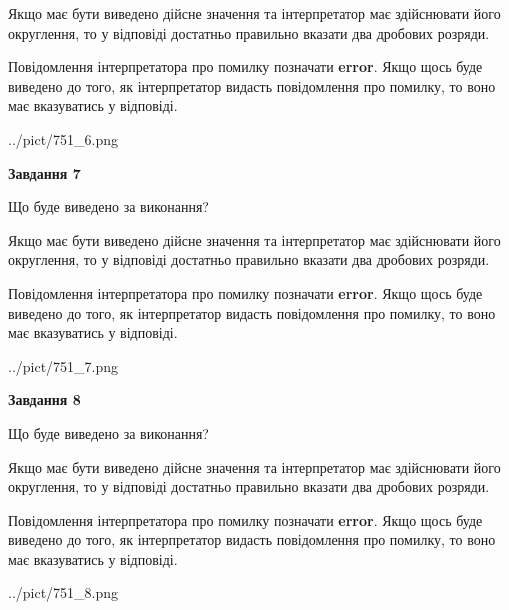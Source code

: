 \documentclass[12pt, ukrainian]{article}
\begin{document}
{\begin {Large}
Якщо має бути виведено дійсне значення та інтерпретатор має здійснювати його округлення, 
то у відповіді достатньо правильно вказати два дробових розряди.

Повідомлення інтерпретатора про помилку позначати \textbf{error}.
Якщо щось буде виведено до того, як інтерпретатор видасть повідомлення про помилку, 
то воно має вказуватись у відповіді. \par

\begin{center}
	{../pict/751_6.png}
\end{center}
\newpage

{\begin {center}\textbf{Завдання 7}\end {center}}\par
Що буде виведено за виконання? \par

Якщо має бути виведено дійсне значення та інтерпретатор має здійснювати його округлення, 
то у відповіді достатньо правильно вказати два дробових розряди.

Повідомлення інтерпретатора про помилку позначати \textbf{error}.
Якщо щось буде виведено до того, як інтерпретатор видасть повідомлення про помилку, 
то воно має вказуватись у відповіді. \par

\begin{center}
	{../pict/751_7.png}
\end{center}
\newpage

{\begin {center}\textbf{Завдання 8}\end {center}}\par
Що буде виведено за виконання? \par

Якщо має бути виведено дійсне значення та інтерпретатор має здійснювати його округлення, 
то у відповіді достатньо правильно вказати два дробових розряди.

Повідомлення інтерпретатора про помилку позначати \textbf{error}.
Якщо щось буде виведено до того, як інтерпретатор видасть повідомлення про помилку, 
то воно має вказуватись у відповіді. \par

\begin{center}
	{../pict/751_8.png}
\end{center}
\newpage


\end{Large}}
\end{document}
